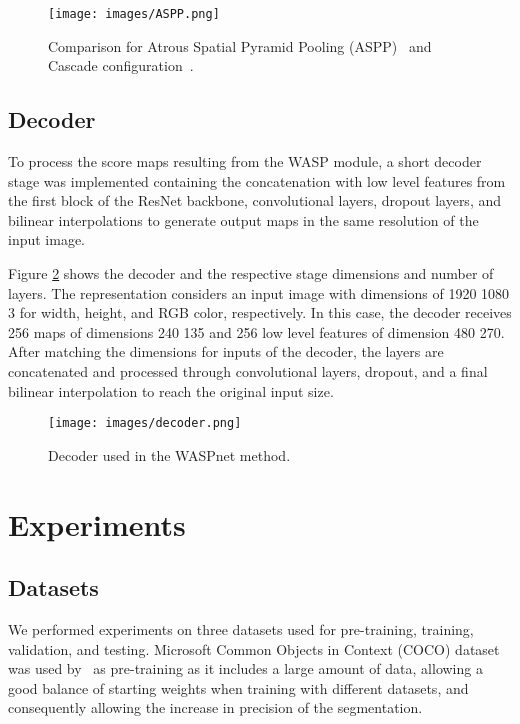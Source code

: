 \documentclass[sensors,article,accept,moreauthors,pdftex]{Definitions/mdpi}
\begin{document}
\begin{figure}[H]
\centering
\texttt{[image: images/ASPP.png]}
\caption{Comparison for Atrous Spatial Pyramid Pooling (ASPP)~\cite{DeepLab} and Cascade configuration~\cite{Rethinking}.}
\label{fig:ASPP}
\end{figure}

\subsection{Decoder}
To process the score maps resulting from the WASP module, a short decoder stage was implemented containing the concatenation with low level features from the first block of the ResNet backbone, convolutional layers, dropout layers, and bilinear interpolations to generate output maps in the same resolution of the input image.

Figure \ref{fig:decoder} shows the decoder and the respective stage dimensions and number of layers. The representation considers an input image with dimensions of 1920  1080  3 for width, height, and RGB color, respectively. In this case, the decoder receives 256 maps of dimensions 240  135 and 256 low level features of dimension 480  270. After matching the dimensions for inputs of the decoder, the layers are concatenated and processed through convolutional layers, dropout, and a final bilinear interpolation to reach the original input size.


\begin{figure}[H]
\centering
\texttt{[image: images/decoder.png]}
\caption{Decoder used in the WASPnet method.}
\label{fig:decoder}
\end{figure}

\section{Experiments}
\vspace{-6pt}

\subsection{Datasets}
We performed experiments on three datasets used for pre-training, training, validation, and testing.
Microsoft Common Objects in Context (COCO) dataset~\cite{COCO} was used by~\cite{DeepLab} as pre-training as it includes a large amount of data, allowing a good balance of starting weights when training with different datasets, and consequently allowing the increase in precision of the segmentation.
\end{document}
